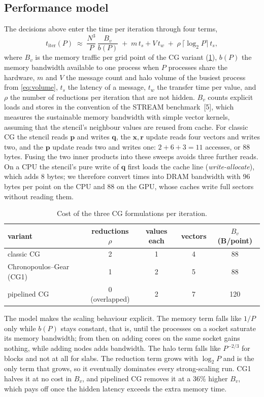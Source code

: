 \documentclass[10pt,a4paper]{article}
\newcommand{\vb}[1]{\mathbf{#1}}
\begin{document}
\subsection{Performance model}\label{sec:model}
The decisions above enter the time per iteration through four terms,
\begin{equation}\label{eq:model}
  t_{\text{iter}}(P)\;\approx\;\frac{N^3}{P}\,\frac{B_v}{b(P)}\;+\;m\,t_s+V\,t_w\;+\;\rho\,\lceil\log_2P\rceil\,t_s ,
\end{equation}
where $B_v$ is the memory traffic per grid point of the CG variant (\cref{tab:variants-cost}), $b(P)$ the
memory bandwidth available to one process when $P$ processes share the hardware, $m$ and $V$ the message
count and halo volume of the busiest process from \eqref{eq:volume}, $t_s$ the latency of a message,
$t_w$ the transfer time per value, and $\rho$ the number of reductions per iteration that are not hidden.
$B_v$ counts explicit loads and stores in the convention of the STREAM benchmark~[5], which measures the
sustainable memory bandwidth with simple vector kernels, assuming that the
stencil's neighbour values are reused from cache. For classic CG the stencil reads $\vb p$ and writes $\vb
q$, the $\vb x,\vb r$ update reads four vectors and writes two, and the $\vb p$ update reads two and writes
one: $2+6+3=11$ accesses, or 88 bytes. Fusing the two inner products into these sweeps avoids three further
reads. On a CPU the stencil's pure write of $\vb q$ first loads the cache line (\emph{write-allocate}), which
adds 8 bytes; we therefore convert times into DRAM bandwidth with 96 bytes per point on the CPU and 88 on
the GPU, whose caches write full sectors without reading them.

\begin{table}[t]
\centering\small
\caption{Cost of the three CG formulations per iteration.}\label{tab:variants-cost}
\begin{tabular}{lcccc}
\toprule
variant & reductions $\rho$ & values each & vectors & $B_v$ (B/point) \\
\midrule
classic CG & 2 & 1 & 4 & 88 \\
Chronopoulos--Gear (CG1) & 1 & 2 & 5 & 88 \\
pipelined CG & 0 (overlapped) & 2 & 7 & 120 \\
\bottomrule
\end{tabular}
\end{table}

The model makes the scaling behaviour explicit. The memory term falls like $1/P$ only while $b(P)$ stays
constant, that is, until the processes on a socket saturate its memory bandwidth; from then on adding
cores on the same socket gains nothing, while adding nodes adds bandwidth. The halo term falls like
$P^{-2/3}$ for blocks and not at all for slabs. The reduction term grows with $\log_2P$ and is the only
term that grows, so it eventually dominates every strong-scaling run. CG1 halves it at no cost in $B_v$,
and pipelined CG removes it at a 36\% higher $B_v$, which pays off once the hidden latency exceeds the extra
memory time.
\end{document}
